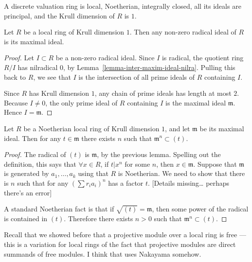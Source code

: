 \begin{corollary}
\label{lemma-dvr-basic-properties}
A discrete valuation ring is local,
Noetherian, integrally closed, all its ideals
are principal, and the Krull dimension of $R$
is $1$.
\end{corollary}

\begin{lemma}
\label{lemma-radical-ideal-local-dim1}
Let $R$ be a local ring of Krull dimension
$1$. Then any non-zero radical ideal of $R$
is its maximal ideal.
\end{lemma}

\begin{proof}
Let $I\subset R$ be a non-zero radical ideal.
Since $I$ is radical, the quotient ring
$R/I$ has nilradical $0$, by
Lemma~\ref{lemma-inter-maxim-ideal-nilra}.
Pulling this back to $R$, we see that
$I$ is the intersection of all prime ideals
of $R$ containing $I$.

Since $R$ has Krull dimension $1$, any chain
of prime ideals has length at most $2$. Because
$I\neq 0$, the only prime ideal of $R$
containing $I$ is the maximal ideal
$\mathfrak{m}$. Hence $I=\mathfrak{m}$.
\end{proof}

\begin{corollary}
\label{lemma-power-in-maximal-ideal}
Let $R$ be a Noetherian local ring of Krull
dimension $1$, and let $\mathfrak{m}$ be its
maximal ideal. Then for any $t\in\mathfrak{m}$
there exists $n$ such that
$\mathfrak{m}^n\subset (t)$.
\end{corollary}

\begin{proof}
The radical of $(t)$ is $\mathfrak{m}$, by the
previous lemma.
Spelling out the definition, this says
that $\forall x \in R$, if
$t|x^n$ for some $n$, 
then $x \in \mathfrak{m}$.
Suppose that $\mathfrak{m}$ is generated
by $a_1,…,a_k$ using that $R$
is Noetherian.
We need to show that there is $n$
such that for any
$\left(\sum r_ia_i\right)^n$
has a factor $t$.
[Details missing… perhaps there's an error]

A standard Noetherian fact is that if
$\sqrt{(t)}=\mathfrak{m}$, then some power of the
radical is contained in $(t)$. Therefore there
exists $n>0$ such that
$\mathfrak{m}^n\subset (t)$.
\end{proof}

\noindent
Recall that we showed before
that a projective module over a local
ring is free --- this is a variation
for local rings of the fact
that projective modules
are direct summands of free modules.
I think that uses Nakayama somehow.

